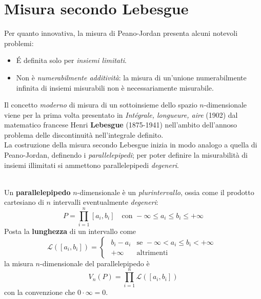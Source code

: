 	\section{Misura secondo Lebesgue}
	Per quanto innovativa, la misura di Peano-Jordan presenta alcuni notevoli problemi:
	\begin{itemize}
		\item É definita solo per \textit{insiemi limitati}.
		\item Non è \textit{numerabilmente additività}: la misura di un'unione numerabilmente infinita di insiemi misurabili non è necessariamente misurabile.
	\end{itemize}
	Il concetto \textit{moderno} di misura di un sottoinsieme dello spazio $n$-dimensionale viene per la prima volta presentato in \textit{Intégrale, longueure, aire} (1902)
	dal matematico francese Henri \textbf{Lebesgue} (1875-1941) nell'ambito dell'annoso problema delle discontinuità nell'integrale definito.\\
	La costruzione della misura secondo Lebesgue inizia in modo analogo a quella di Peano-Jordan, definendo i \textit{parallelepipedi}; per poter definire la misurabilità di insiemi illimitati si ammettono parallelepipedi \textit{degeneri}.
	\begin{define}~{}\\
		Un \textbf{parallelepipedo} $n$-dimensionale è un \textit{plurintervallo}, ossia come il prodotto cartesiano di $n$ intervalli eventualmente \textit{degeneri}:
		\begin{equation}
			P=\prod_{i=1}^{n}\left[a_i,b_i\right]\quad\text{con }-\infty \leq a_i \leq b_i \leq +\infty
		\end{equation}
		Posta la \textbf{lunghezza} di un intervallo come
		\begin{equation}
			\mathcal{L}\left(\left[a_i,b_i\right]\right)=
			\begin{cases}
				\begin{array}{ll}
					b_i-a_i & \text{se }-\infty < a_i \leq b_i < +\infty\\
					+\infty&\text{altrimenti}
				\end{array}
			\end{cases}
		\end{equation}
		la misura $n$-dimensionale del parallelepipedo è
		\begin{equation}
			V_n\left(P\right)=\prod_{i=1}^{n}\mathcal{L}\left(\left[a_i,b_i\right]\right)
		\end{equation}
		con la convenzione che $0\cdot \infty =0$.
	\end{define}
